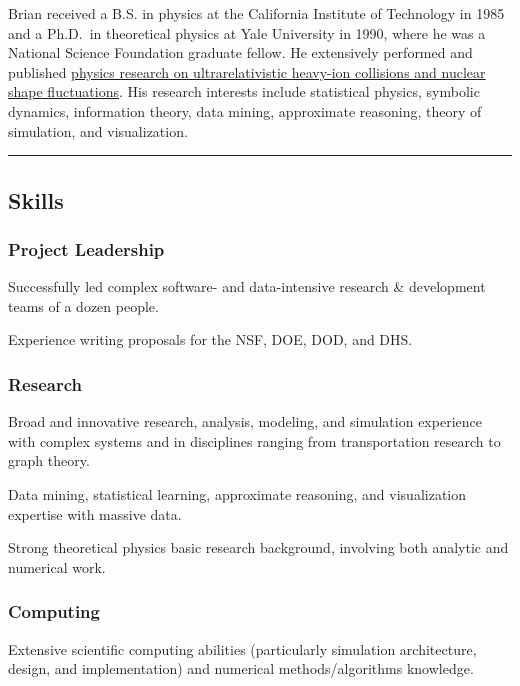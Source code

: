\documentclass[]{article}
\begin{document}
Brian received a B.S. in physics at the California Institute of
Technology in 1985 and a Ph.D.~in theoretical physics at Yale University
in 1990, where he was a National Science Foundation graduate fellow. He
extensively performed and published \href{projects/physics.html}{physics
research on ultrarelativistic heavy-ion collisions and nuclear shape
fluctuations}. His research interests include statistical physics,
symbolic dynamics, information theory, data mining, approximate
reasoning, theory of simulation, and visualization.

\begin{center}\rule{3in}{0.4pt}\end{center}

\subsection{Skills}\label{skills}

\subsubsection{Project Leadership}\label{project-leadership}

Successfully led complex software- and data-intensive research \&
development teams of a dozen people.

Experience writing proposals for the NSF, DOE, DOD, and DHS.

\subsubsection{Research}\label{research}

Broad and innovative research, analysis, modeling, and simulation
experience with complex systems and in disciplines ranging from
transportation research to graph theory.

Data mining, statistical learning, approximate reasoning, and
visualization expertise with massive data.

Strong theoretical physics basic research background, involving both
analytic and numerical work.

\subsubsection{Computing}\label{computing}

Extensive scientific computing abilities (particularly simulation
architecture, design, and implementation) and numerical
methods/algorithms knowledge.
\end{document}
